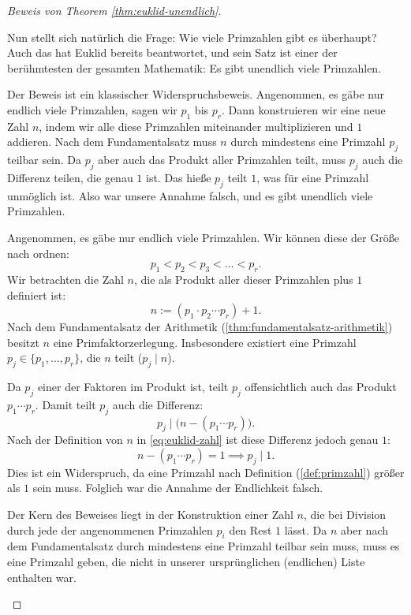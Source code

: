 \begin{proof}[Beweis von Theorem \ref{thm:euklid-unendlich}]
\begin{spoken-clean}[01:01:30 - 01:06:00]
Nun stellt sich natürlich die Frage: Wie viele Primzahlen gibt es überhaupt? Auch das hat Euklid bereits beantwortet, und sein Satz ist einer der berühmtesten der gesamten Mathematik: Es gibt unendlich viele Primzahlen.

Der Beweis ist ein klassischer Widerspruchsbeweis. Angenommen, es gäbe nur endlich viele Primzahlen, sagen wir $p_1$ bis $p_r$. Dann konstruieren wir eine neue Zahl $n$, indem wir alle diese Primzahlen miteinander multiplizieren und $1$ addieren. Nach dem Fundamentalsatz muss $n$ durch mindestens eine Primzahl $p_j$ teilbar sein. Da $p_j$ aber auch das Produkt aller Primzahlen teilt, muss $p_j$ auch die Differenz teilen, die genau $1$ ist. Das hieße $p_j$ teilt $1$, was für eine Primzahl unmöglich ist. Also war unsere Annahme falsch, und es gibt unendlich viele Primzahlen.
\end{spoken-clean}

\begin{math-stroke}
\begin{short-proof}
Angenommen, es gäbe nur endlich viele Primzahlen. Wir können diese der Größe nach ordnen:
\[
p_1 < p_2 < p_3 < \dots < p_r.
\]
Wir betrachten die Zahl $n$, die als Produkt aller dieser Primzahlen plus $1$ definiert ist:
\begin{equation}\label{eq:euklid-zahl}
n := (p_1 \cdot p_2 \cdots p_r) + 1.
\end{equation}
Nach dem Fundamentalsatz der Arithmetik (\cref{thm:fundamentalsatz-arithmetik}) besitzt $n$ eine Primfaktorzerlegung. Insbesondere existiert eine Primzahl $p_j \in \{p_1, \dots, p_r\}$, die $n$ teilt ($p_j \mid n$).

Da $p_j$ einer der Faktoren im Produkt ist, teilt $p_j$ offensichtlich auch das Produkt $p_1 \cdots p_r$. Damit teilt $p_j$ auch die Differenz:
\[
p_j \mid \bigl( n - (p_1 \cdots p_r) \bigr).
\]
Nach der Definition von $n$ in \eqref{eq:euklid-zahl} ist diese Differenz jedoch genau $1$:
\[
n - (p_1 \cdots p_r) = 1 \implies p_j \mid 1.
\]
Dies ist ein Widerspruch, da eine Primzahl nach Definition (\cref{def:primzahl}) größer als $1$ sein muss. Folglich war die Annahme der Endlichkeit falsch.
\end{short-proof}

\begin{explanation-of-steps}
Der Kern des Beweises liegt in der Konstruktion einer Zahl $n$, die bei Division durch jede der angenommenen Primzahlen $p_i$ den Rest $1$ lässt. Da $n$ aber nach dem Fundamentalsatz durch mindestens eine Primzahl teilbar sein muss, muss es eine Primzahl geben, die nicht in unserer ursprünglichen (endlichen) Liste enthalten war.
\end{explanation-of-steps}
\end{math-stroke}
\end{proof}


